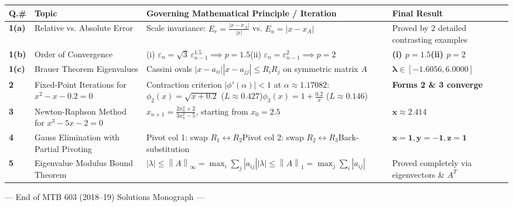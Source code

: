 \documentclass[11pt,a4paper]{article}
\newcommand{\abs}[1]{\left\lvert#1\right\rvert}
\newcommand{\norm}[1]{\left\lVert#1\right\rVert}
\begin{document}
\begin{center}
\renewcommand{\arraystretch}{1.35}
\small
\begin{tabular}{p{0.8cm}p{3.0cm}p{6.4cm}p{4.5cm}}
\toprule
\textbf{Q.\#} & \textbf{Topic} & \textbf{Governing Mathematical Principle / Iteration} & \textbf{Final Result} \\
\midrule
\textbf{1(a)} & Relative vs. Absolute Error & Scale invariance: $E_r = \frac{\abs{x - x_A}}{\abs{x}}$ vs. $E_a = \abs{x - x_A}$ & Proved by 2 detailed contrasting examples \\
\midrule
\textbf{1(b)} & Order of Convergence & (i) $\varepsilon_n = \sqrt{3}\,\varepsilon_{n-1}^{1.5} \implies p = 1.5$\newline (ii) $\varepsilon_n = \varepsilon_{n-1}^2 \implies p = 2$ & \textbf{(i) $p = 1.5$}\newline \textbf{(ii) $p = 2$} \\
\midrule
\textbf{1(c)} & Brauer Theorem Eigenvalues & Cassini ovals $\abs{x - a_{ii}}\abs{x - a_{jj}} \le R_i R_j$ on symmetric matrix $A$ & $\mathbf{\lambda \in [-1.6056, 6.0000]}$ \\
\midrule
\textbf{2} & Fixed-Point Iterations for $x^2 - x - 0.2 = 0$ & Contraction criterion $\abs{\phi'(\alpha)} < 1$ at $\alpha \approx 1.17082$:\newline $\phi_2(x) = \sqrt{x+0.2}$ ($L \approx 0.427$)\newline $\phi_3(x) = 1 + \frac{0.2}{x}$ ($L \approx 0.146$) & \textbf{Forms 2 \& 3 converge} \\
\midrule
\textbf{3} & Newton-Raphson Method for $x^3 - 5x - 2 = 0$ & $x_{n+1} = \frac{2x_n^3 + 2}{3x_n^2 - 5}$, starting from $x_0 = 2.5$ & $\mathbf{x \approx 2.414}$ \\
\midrule
\textbf{4} & Gauss Elimination with Partial Pivoting & Pivot col 1: swap $R_1 \leftrightarrow R_2$\newline Pivot col 2: swap $R_2 \leftrightarrow R_3$\newline Back-substitution & $\mathbf{x = 1, y = -1, z = 1}$ \\
\midrule
\textbf{5} & Eigenvalue Modulus Bound Theorem & $\abs{\lambda} \le \norm{A}_\infty = \max_i \sum_j \abs{a_{ij}}$\newline $\abs{\lambda} \le \norm{A}_1 = \max_j \sum_i \abs{a_{ij}}$ & Proved completely via eigenvectors \& $A^T$ \\
\bottomrule
\end{tabular}
\end{center}

\vspace{25pt}
\begin{center}
    {\small\color{darkgray}--- End of MTB 603 (2018--19) Solutions Monograph ---}
\end{center}
\end{document}
